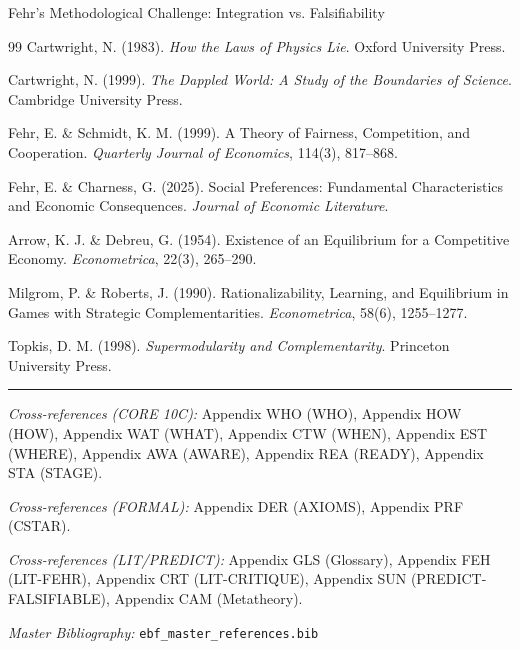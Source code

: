 \begin{chapter}{Fehr's Methodological Challenge: Integration vs. Falsifiability}
\begin{thebibliography}{99}
 Cartwright, N. (1983). \textit{How the Laws of Physics Lie}. Oxford University Press.

 Cartwright, N. (1999). \textit{The Dappled World: A Study of the Boundaries of Science}. Cambridge University Press.

 Fehr, E. \& Schmidt, K. M. (1999). A Theory of Fairness, Competition, and Cooperation. \textit{Quarterly Journal of Economics}, 114(3), 817--868.

 Fehr, E. \& Charness, G. (2025). Social Preferences: Fundamental Characteristics and Economic Consequences. \textit{Journal of Economic Literature}.

 Arrow, K. J. \& Debreu, G. (1954). Existence of an Equilibrium for a Competitive Economy. \textit{Econometrica}, 22(3), 265--290.

 Milgrom, P. \& Roberts, J. (1990). Rationalizability, Learning, and Equilibrium in Games with Strategic Complementarities. \textit{Econometrica}, 58(6), 1255--1277.

 Topkis, D. M. (1998). \textit{Supermodularity and Complementarity}. Princeton University Press.

\end{thebibliography}


\vspace{1em}
\hrule
\vspace{0.5em}

\noindent\textit{Cross-references (CORE 10C):}
Appendix WHO (WHO),
Appendix HOW (HOW),
Appendix WAT (WHAT),
Appendix CTW (WHEN),
Appendix EST (WHERE),
Appendix AWA (AWARE),
Appendix REA (READY),
Appendix STA (STAGE).

\noindent\textit{Cross-references (FORMAL):}
Appendix DER (AXIOMS),
Appendix PRF (CSTAR).

\noindent\textit{Cross-references (LIT/PREDICT):}
Appendix GLS (Glossary),
Appendix FEH (LIT-FEHR),
Appendix CRT (LIT-CRITIQUE),
Appendix SUN (PREDICT-FALSIFIABLE),
Appendix CAM (Metatheory).

\noindent\textit{Master Bibliography:} \texttt{ebf\_master\_references.bib}

\nocite{bcm_master}

\end{chapter}

